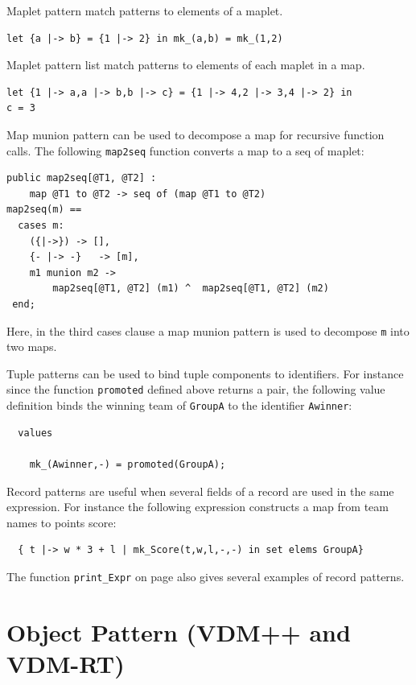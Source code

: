 \documentclass{overturerepchap}
\begin{document}
{\begin{description}
Maplet pattern match patterns to elements of a maplet.
\begin{lstlisting}
let {a |-> b} = {1 |-> 2} in mk_(a,b) = mk_(1,2)
\end{lstlisting}

Maplet pattern list match patterns to elements of each maplet in a map.
\begin{lstlisting}
let {1 |-> a,a |-> b,b |-> c} = {1 |-> 4,2 |-> 3,4 |-> 2} in
c = 3
\end{lstlisting}

Map munion pattern can be used to decompose a map for recursive function calls. The following \texttt{map2seq} function converts a map to a seq of maplet:
\begin{lstlisting}
public map2seq[@T1, @T2] :
    map @T1 to @T2 -> seq of (map @T1 to @T2)
map2seq(m) ==
  cases m:
    ({|->})	-> [],
    {- |-> -}	-> [m],
    m1 munion m2 ->
        map2seq[@T1, @T2] (m1) ^  map2seq[@T1, @T2] (m2)
 end;
\end{lstlisting}
Here, in the third cases clause a map munion pattern is used to decompose \texttt{m}
into two maps.

Tuple patterns can be used to bind tuple components to
identifiers. For instance since the function \texttt{promoted} defined
above returns a pair, the following value definition binds the winning
team of \texttt{GroupA} to the identifier \texttt{Awinner}:
\begin{lstlisting}
  values

    mk_(Awinner,-) = promoted(GroupA);
\end{lstlisting}

Record patterns are useful when several fields of a record are used in
the same expression. For instance the following expression constructs
a map from team names to points score:
\begin{lstlisting}
  { t |-> w * 3 + l | mk_Score(t,w,l,-,-) in set elems GroupA}
\end{lstlisting}
The function \texttt{print\_Expr} on page \pageref{printExprDef} also gives
several examples of record patterns.
\end{description}


\section{Object Pattern (VDM++ and VDM-RT)}\label{sec:object_pattern}

\begin{description}


\end{description}}
\end{document}
